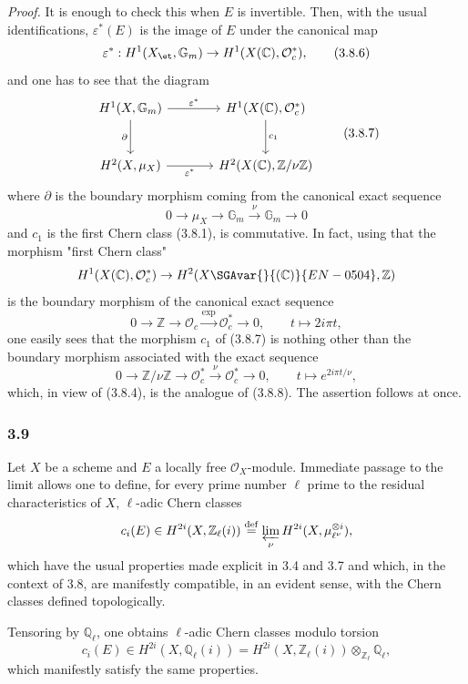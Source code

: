\emph{Proof.} It is enough to check this when $E$ is invertible. Then, with the usual identifications, $\varepsilon^*(E)$ is the image of $E$ under the canonical map
\[
\varepsilon^*:H^1(X_{\et},\mathbb G_m)\to H^1(X(\mathbb C),\mathcal O_c^*),
\tag{3.8.6}
\]
and one has to see that the diagram
\[
\begin{tikzcd}[column sep=large,row sep=large]
H^1(X,\mathbb G_m) \arrow[r,"\varepsilon^*"] \arrow[d,"\partial"'] &
H^1(X(\mathbb C),\mathcal O_c^*) \arrow[d,"c_1"]\\
H^2(X,\mu_X) \arrow[r,"\varepsilon^*"'] &
H^2(X(\mathbb C),\mathbb Z/\nu\mathbb Z)
\end{tikzcd}
\tag{3.8.7}
\]
where $\partial$ is the boundary morphism coming from the canonical exact sequence
\[
0\to \mu_X\to\mathbb G_m\xrightarrow{\nu}\mathbb G_m\to0
\tag{3.8.8}
\]
and $c_1$ is the first Chern class (3.8.1), is commutative. In fact, using that the morphism "first Chern class"
\[
H^1(X(\mathbb C),\mathcal O_c^*)\to H^2(X\SGAvar{}{(\mathbb C)}{EN-0504},\mathbb Z)
\]
is the boundary morphism of the canonical exact sequence
\[
0\to\mathbb Z\to\mathcal O_c\xrightarrow{\exp}\mathcal O_c^*\to0,
\qquad
t\mapsto 2i\pi t,
\]
one easily sees that the morphism $c_1$ of (3.8.7) is nothing other than the boundary morphism associated with the exact sequence
\[
0\to\mathbb Z/\nu\mathbb Z\to\mathcal O_c^*\xrightarrow{\nu}\mathcal O_c^*\to0,
\qquad
t\mapsto e^{2i\pi t/\nu},
\]
which, in view of (3.8.4), is the analogue of (3.8.8). The assertion follows at once.

\subsubsection*{3.9}
Let $X$ be a scheme and $E$ a locally free $\mathcal O_X$-module. Immediate passage to the limit allows one to define, for every prime number $\ell$ prime to the residual characteristics of $X$, $\ell$-adic Chern classes
\[
c_i(E)\in H^{2i}(X,\mathbb Z_\ell(i))
\stackrel{\mathrm{def}}{=}\varprojlim_\nu H^{2i}(X,\mu_{\ell^\nu}^{\otimes i}),
\]
which have the usual properties made explicit in 3.4 and 3.7 and which, in the context of 3.8, are manifestly compatible, in an evident sense, with the Chern classes defined topologically.

Tensoring by $\mathbb Q_\ell$, one obtains $\ell$-adic Chern classes modulo torsion
\[
c_i(E)\in H^{2i}(X,\mathbb Q_\ell(i))
=H^{2i}(X,\mathbb Z_\ell(i))\otimes_{\mathbb Z_\ell}\mathbb Q_\ell,
\]
which manifestly satisfy the same properties.

